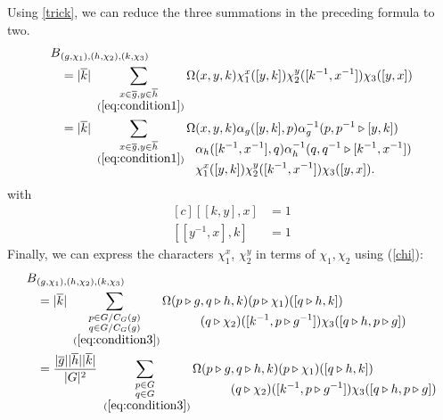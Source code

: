 \documentclass[a4paper, 10pt]{book}
\theoremstyle{definition}
\numberwithin{equation}{chapter}
\newcommand\ol[1]{\overline{#1}}
\newcommand\hit{\triangleright}
\newcommand\inv{^{-1}}
\begin{document}
Using \cref{trick}, we can reduce the three summations in the preceding formula to two.
\begin{align*}
  B&_{(g,\chi_1),(h,\chi_2),(k,\chi_3)}\\
   &=|\ol k|\sum_{\substack{x\in\ol g,y\in\ol h \\~(\cref{eq:condition1})}}\Omega(x,y,k)\chi_1^x([y,k])\chi_2^y([k\inv,x\inv])\chi_3([y,x])\\
   &=|\ol k|\sum_{\substack{x\in\ol g,y\in\ol h \\~(\cref{eq:condition1})}}
  \begin{aligned}[t]
    \Omega&(x,y,k)\alpha_{g} ([y, k], p)\alpha^{-1}_{g}(p, p^{-1} \hit [y, k])\\
    &\alpha_{h}([k^{-1}, x^{-1}],q) \alpha^{-1}_{h} (q, q^{-1} \hit [k^{-1},x^{-1}])\\
    &\chi_1^x([y,k])\chi_2^y([k\inv,x\inv])\chi_3([y,x]).
  \end{aligned}
\end{align*}
with
\begin{equation}\label{eq:condition1}
  \begin{aligned}[c]
    [[k, y], x] &= 1\\
    [[y^{-1}, x],k]&=1
  \end{aligned}
\end{equation}
Finally, we can express the characters $\chi_1^x$, $\chi_2^y$ in terms of $\chi_1,\chi_2$ using (\cref{chi}):
\begin{align}
  B&_{(g,\chi_1),(h,\chi_2),(k,\chi_3)}\notag\\
   &=|\ol k|\sum_{\substack{p\in G/C_G(g)\\q\in G/C_G(g)\\~(\cref{eq:condition3})}}
  \begin{aligned}[t]\Omega(p\hit g&,q\hit h,k)(p\hit\chi_1)([q\hit h,k])\\
    &(q\hit \chi_2)([k\inv,p\hit g\inv])\chi_3([q\hit h,p\hit g])  
  \end{aligned}\\
   &=\frac{|\ol g||\ol h||\ol k|}{|G|^2}\sum_{\substack{p\in G\\q\in G
  \\~(\cref{eq:condition3})}}\label{eq:1}
  \begin{aligned}[t]\Omega(p\hit g&,q\hit h,k)(p\hit\chi_1)([q\hit h,k])\\
    &(q\hit \chi_2)([k\inv,p\hit g\inv])\chi_3([q\hit h,p\hit g])  
  \end{aligned}
\end{align}
\end{document}
